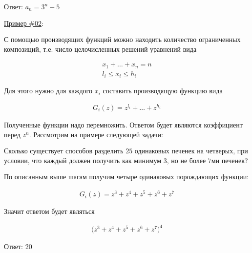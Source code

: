 Ответ: \(a_{n} = 3^{n} - 5\)

\underline{Пример \#02}:

С помощью производящих функций можно находить количество ограниченных
композиций, т.е. число целочисленных решений уравнений вида

\begin{align*}
  x_{1} + \dotsc + x_{n} = n \\
  l_{i} \le x_{i} \le h_{i}
\end{align*}

Для этого нужно для каждого \(x_{i}\) составить производящую функцию вида

\begin{align*}
  G_{i}(z) = z^{l_{i}} + \dotsc + z^{h_{i}}
\end{align*}

Полученные функции надо перемножить. Ответом будет являются коэффициент перед
\(z^{n}\). Рассмотрим на примере следующей задачи:

Сколько существует способов разделить \(25\) одинаковых печенек на четверых, при
условии, что каждый должен получить как минимум \(3\), но не более \(7\)ми
печенек?

По описанным выше шагам получим четыре одинаковых порождающих функции:

\begin{align*}
  G_{i}(z) = z^{3} + z^{4} + z^{5} + z^{6} + z^{7}
\end{align*}

Значит ответом будет являться

\begin{align*}
  [z^{25}] \Big( z^{3} + z^{4} + z^{5} + z^{6} + z^{7} \Big)^{4}
\end{align*}

Ответ: \(20\)


